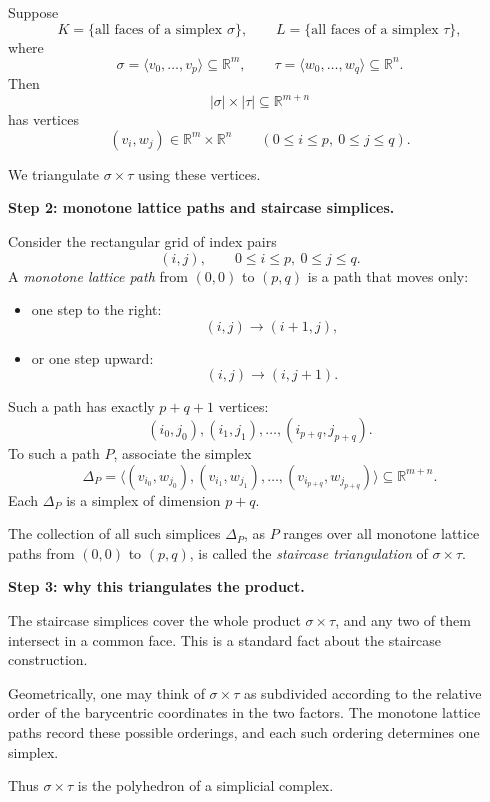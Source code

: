 \documentclass[12pt,a4paper]{article}
\theoremstyle{notespace}
\begin{document}
Suppose
\[
K=\{\text{all faces of a simplex }\sigma\},
\qquad
L=\{\text{all faces of a simplex }\tau\},
\]
where
\[
\sigma=\langle v_0,\dots,v_p\rangle \subseteq \mathbb R^m,
\qquad
\tau=\langle w_0,\dots,w_q\rangle \subseteq \mathbb R^n.
\]
Then
\[
|\sigma|\times |\tau| \subseteq \mathbb R^{m+n}
\]
has vertices
\[
(v_i,w_j)\in \mathbb R^m\times \mathbb R^n
\qquad
(0\le i\le p,\ 0\le j\le q).
\]

We triangulate \(\sigma\times \tau\) using these vertices.

\medskip

\textbf{Step 2: monotone lattice paths and staircase simplices.}

Consider the rectangular grid of index pairs
\[
(i,j),
\qquad
0\le i\le p,\ 0\le j\le q.
\]
A \emph{monotone lattice path} from \((0,0)\) to \((p,q)\) is a path that moves only:
\begin{itemize}
	\item one step to the right:
	\[
	(i,j)\to (i+1,j),
	\]
	\item or one step upward:
	\[
	(i,j)\to (i,j+1).
	\]
\end{itemize}

Such a path has exactly \(p+q+1\) vertices:
\[
(i_0,j_0),(i_1,j_1),\dots,(i_{p+q},j_{p+q}).
\]
To such a path \(P\), associate the simplex
\[
\Delta_P=
\langle
(v_{i_0},w_{j_0}),
(v_{i_1},w_{j_1}),
\dots,
(v_{i_{p+q}},w_{j_{p+q}})
\rangle
\subseteq \mathbb R^{m+n}.
\]
Each \(\Delta_P\) is a simplex of dimension \(p+q\).

The collection of all such simplices \(\Delta_P\), as \(P\) ranges over all monotone lattice paths from \((0,0)\) to \((p,q)\), is called the \emph{staircase triangulation} of \(\sigma\times\tau\).

\medskip

\textbf{Step 3: why this triangulates the product.}

The staircase simplices cover the whole product \(\sigma\times\tau\), and any two of them intersect in a common face. This is a standard fact about the staircase construction.

Geometrically, one may think of \(\sigma\times\tau\) as subdivided according to the relative order of the barycentric coordinates in the two factors. The monotone lattice paths record these possible orderings, and each such ordering determines one simplex.

Thus \(\sigma\times\tau\) is the polyhedron of a simplicial complex.

\medskip
\end{document}
